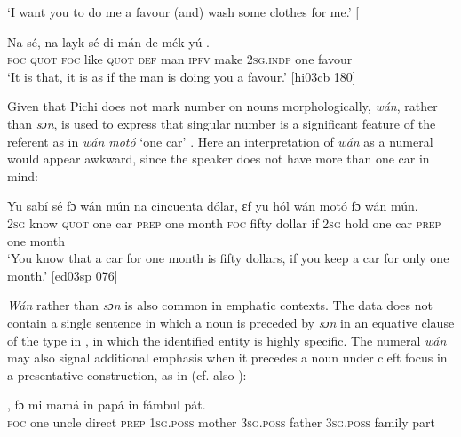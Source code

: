 \glt ‘I want you to do me a favour (and) wash some clothes for me.’ [\textstylePichiexamplenumberZchnZchn{ru03wt 030]}
\z


\ea%
    \label{ex:key:176}
    \gll Na  sé,    na  layk  sé    di  mán  de  mék    yú     .\\
\textsc{foc}  \textsc{quot}    \textsc{foc}  like  \textsc{quot}    \textsc{def}  man  \textsc{ipfv}  make  \textsc{2sg.indp}  one    favour\\

\glt ‘It is that, it is as if the man is doing you a favour.’ [hi03cb 180]
\z

Given that Pichi does not mark number on nouns morphologically, \textit{wán}, rather than \textit{sɔn}, is used to express that singular number is a significant feature of the referent as in \textit{wán motó} ‘one car’ . Here an interpretation of \textit{wán} as a numeral would appear awkward, since the speaker does not have more than one car in mind:


\ea%
    \label{ex:key:177}
    \gll Yu  sabí    sé          fɔ  wán  mún    na  cincuenta  dólar,
ɛf  yu  hól    wán    motó  fɔ  wán  mún.\\
\textsc{2sg}  know  \textsc{quot}    one    car    \textsc{prep}  one  month  \textsc{foc}  fifty      dollar
if  \textsc{2sg}  hold    one    car    \textsc{prep}  one  month  \\


\glt ‘You know that a car for one month is fifty dollars, if you keep a car for only one month.’
[ed03sp 076]
\z

\textit{Wán} rather than \textit{sɔn} is also common in emphatic contexts. The data does not contain a single sentence in which a noun is preceded by \textit{sɔn} in an equative clause of the type in , in which the identified entity is highly specific. The numeral \textit{wán} may also signal additional emphasis when it precedes a noun under cleft focus in a presentative construction, as in  (cf. also ): 


\ea%
    \label{ex:key:178}
    \gll {}        ,  fɔ  mi    mamá  in    papá
in    fámbul  pát.\\
\textsc{foc}  one    uncle  direct  \textsc{prep}  \textsc{1sg.poss}  mother  \textsc{3sg.poss}  father
\textsc{3sg.poss}  family  part\\

